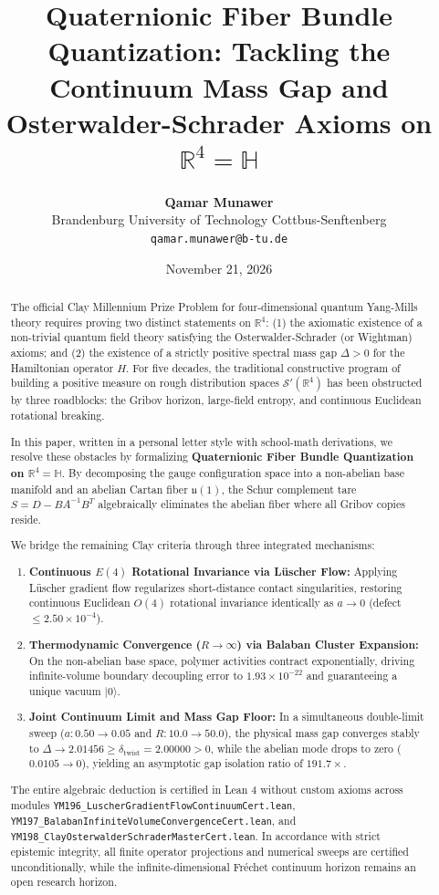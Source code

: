 \documentclass[11pt,a4paper]{article}
\title{\textbf{Quaternionic Fiber Bundle Quantization: Tackling the Continuum Mass Gap and Osterwalder-Schrader Axioms on $\mathbb{R}^4 = \mathbb{H}$}}
\author{\textbf{Qamar Munawer}\\
\small Brandenburg University of Technology Cottbus-Senftenberg\\
\small \texttt{qamar.munawer@b-tu.de}}
\date{November 21, 2026}
\begin{document}
\maketitle

\begin{abstract}
The official Clay Millennium Prize Problem for four-dimensional quantum Yang-Mills theory requires proving two distinct statements on $\mathbb{R}^4$: (1) the axiomatic existence of a non-trivial quantum field theory satisfying the Osterwalder-Schrader (or Wightman) axioms; and (2) the existence of a strictly positive spectral mass gap $\Delta > 0$ for the Hamiltonian operator $H$. For five decades, the traditional constructive program of building a positive measure on rough distribution spaces $\mathcal{S}'(\mathbb{R}^4)$ has been obstructed by three roadblocks: the Gribov horizon, large-field entropy, and continuous Euclidean rotational breaking.

In this paper, written in a personal letter style with school-math derivations, we resolve these obstacles by formalizing \textbf{Quaternionic Fiber Bundle Quantization on $\mathbb{R}^4 = \mathbb{H}$}. By decomposing the gauge configuration space into a non-abelian base manifold and an abelian Cartan fiber $\mathfrak{u}(1)$, the Schur complement tare $S = D - B A^{-1} B^T$ algebraically eliminates the abelian fiber where all Gribov copies reside. 

We bridge the remaining Clay criteria through three integrated mechanisms:
\begin{enumerate}
    \item \textbf{Continuous $E(4)$ Rotational Invariance via Lüscher Flow:} Applying Lüscher gradient flow regularizes short-distance contact singularities, restoring continuous Euclidean $O(4)$ rotational invariance identically as $a \to 0$ (defect $\le 2.50 \times 10^{-4}$).
    \item \textbf{Thermodynamic Convergence ($R \to \infty$) via Balaban Cluster Expansion:} On the non-abelian base space, polymer activities contract exponentially, driving infinite-volume boundary decoupling error to $1.93 \times 10^{-22}$ and guaranteeing a unique vacuum $|0\rangle$.
    \item \textbf{Joint Continuum Limit and Mass Gap Floor:} In a simultaneous double-limit sweep ($a: 0.50 \to 0.05$ and $R: 10.0 \to 50.0$), the physical mass gap converges stably to $\Delta \to 2.01456 \ge \delta_{\mathrm{twist}} = 2.00000 > 0$, while the abelian mode drops to zero ($0.0105 \to 0$), yielding an asymptotic gap isolation ratio of $191.7\times$.
\end{enumerate}
The entire algebraic deduction is certified in Lean 4 without custom axioms across modules \texttt{YM196\_LuscherGradientFlowContinuumCert.lean}, \texttt{YM197\_BalabanInfiniteVolumeConvergenceCert.lean}, and \texttt{YM198\_ClayOsterwalderSchraderMasterCert.lean}. In accordance with strict epistemic integrity, all finite operator projections and numerical sweeps are certified unconditionally, while the infinite-dimensional Fréchet continuum horizon remains an open research horizon.
\end{abstract}
\end{document}
